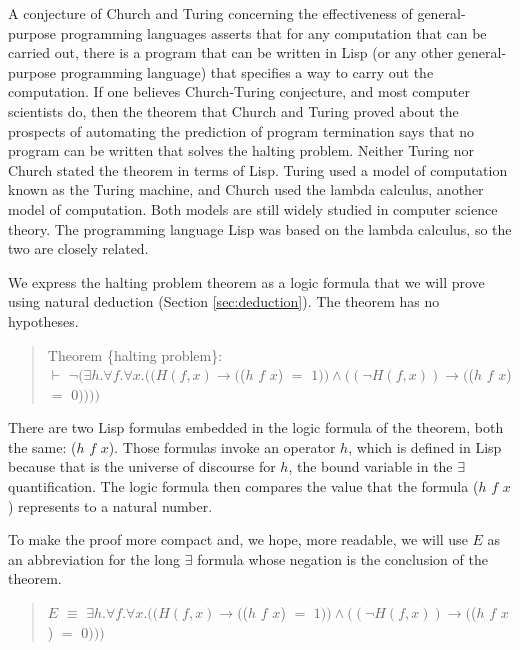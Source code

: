 \label{church-turing-hypothesis}A
conjecture of Church and Turing
concerning the effectiveness of general-purpose programming languages
asserts that for any computation that can be carried out, there is a program
that can be written in Lisp (or any other general-purpose programming language)
that specifies a way to carry out the computation.
If one believes Church-Turing conjecture, and most computer scientists do,
then the theorem that Church and Turing proved about the prospects of
automating the prediction of program termination
says that no program can be written that solves the halting problem.
Neither Turing nor Church stated the theorem in terms of Lisp.
Turing used a model of computation known as the Turing machine, and
Church used the lambda calculus, another model of computation.
Both models are still widely studied in computer science theory.
The programming language Lisp
was based on the lambda calculus, so the two are closely related.

We express the halting problem
theorem as a logic formula that we will prove
using natural deduction (Section \ref{sec:deduction}).
The theorem has no hypotheses.
\begin{quote}
Theorem \{halting problem\}:\\
$\vdash$ $\neg(\exists h. \forall f. \forall x.
((H(f, x) \rightarrow ($\textsf{($h$ $f$ $x$)} $=$ $1)) \wedge ((\neg H(f, x)) \rightarrow ($\textsf{($h$ $f$ $x$)} $=$ $0))))$
\end{quote}

There are two Lisp formulas embedded in
the logic formula of the theorem, both the same:
\textsf{($h$ $f$ $x$)}.
Those formulas invoke an operator $h$, which is defined in Lisp because that is the universe
of discourse for $h$, the bound variable in the $\exists$ quantification.
The logic formula then compares the value that
the formula \textsf{($h$ $f$ $x$)} represents to a natural number.

To make the proof more compact and, we hope, more readable,
we will use $E$ as an abbreviation for the
long $\exists$ formula whose negation is the conclusion of the theorem.
\begin{quote}
$E$ $\equiv$ $\exists h. \forall f. \forall x.
((H(f, x) \rightarrow ($\textsf{($h$ $f$ $x$)} $=$ $1)) \wedge ((\neg H(f, x)) \rightarrow ($\textsf{($h$ $f$ $x$)} $=$ $0)))$
\end{quote}

